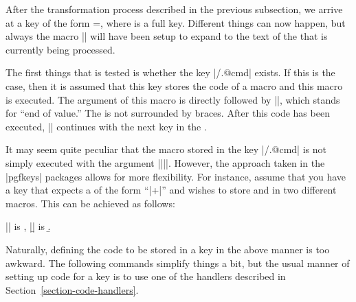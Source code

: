 After the transformation process described in the previous subsection,
we arrive at a key of the form =, where
 is a full key. Different things can now happen, but always
the macro |\pgfkeyscurrentkey| will have been setup to expand to the
text of the  that is currently being processed.

The first things that is tested is whether the key |/.@cmd|
exists. If this is the case, then it is assumed that this key stores
the code of a macro and this macro is executed. The argument of this
macro is  directly followed by |\pgfeov|, which stands for
``end of value.'' The  is not surrounded by braces. After
this code has been executed, |\pgfkeys| continues with the next key in
the .

It may seem quite peculiar that the macro stored in the key
|/.@cmd| is not simply executed with the argument
|{||}|. However, the approach taken in the |pgfkeys|
packages allows for more flexibility. For instance, assume that you
have a key that expects a  of the form
``|+|'' and wishes to store  and
 in two different macros. This can be achieved as
follows:
\begin{codeexample}[]
\def\mystore#1+#2\pgfeov{\def\a{#1}\def\b{#2}}

|\a| is \a, |\b| is \b.
\end{codeexample}

Naturally, defining the code to be stored in a key in the above manner
is too awkward. The following commands simplify things a bit, but the
usual manner of setting up code for a key is to use one of the
handlers described in Section~\ref{section-code-handlers}.


